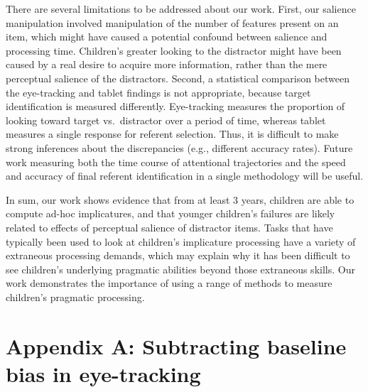\documentclass[a4paper,man,apacite,floatsintext]{apa6}
\begin{document}
There are several limitations to be addressed about our work. First, our
salience manipulation involved manipulation of the number of features
present on an item, which might have caused a potential confound between
salience and processing time. Children's greater looking to the
distractor might have been caused by a real desire to acquire more
information, rather than the mere perceptual salience of the
distractors. Second, a statistical comparison between the eye-tracking
and tablet findings is not appropriate, because target identification is
measured differently. Eye-tracking measures the proportion of looking
toward target vs.~distractor over a period of time, whereas tablet
measures a single response for referent selection. Thus, it is difficult
to make strong inferences about the discrepancies (e.g., different
accuracy rates). Future work measuring both the time course of
attentional trajectories and the speed and accuracy of final referent
identification in a single methodology will be useful.

In sum, our work shows evidence that from at least 3 years, children are
able to compute ad-hoc implicatures, and that younger children's
failures are likely related to effects of perceptual salience of
distractor items. Tasks that have typically been used to look at
children's implicature processing have a variety of extraneous
processing demands, which may explain why it has been difficult to see
children's underlying pragmatic abilities beyond those extraneous
skills. Our work demonstrates the importance of using a range of methods
to measure children's pragmatic processing.

\newpage

\section{Appendix A: Subtracting baseline bias in
eye-tracking}\label{appendix-a-subtracting-baseline-bias-in-eye-tracking}
\end{document}
